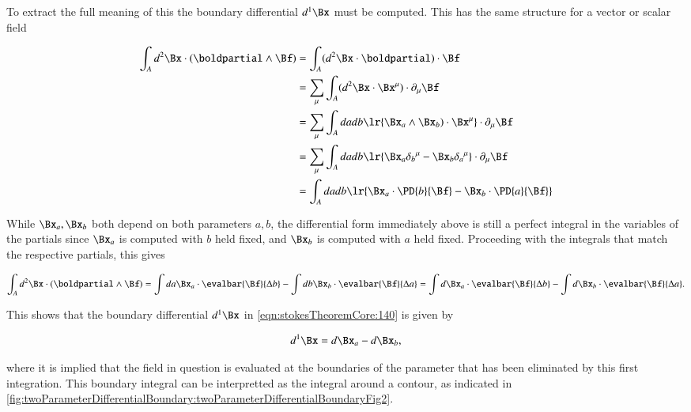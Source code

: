To extract the full meaning of this the boundary differential \( d^1 \Bx \) must be computed.  This has the same structure for a vector or scalar field

\begin{dmath}\label{eqn:stokesTheoremCore:220}
\begin{aligned}
\int_A d^2 \Bx \cdot (\boldpartial \wedge \Bf)
&=
\int_A (d^2 \Bx \cdot \boldpartial) \cdot \Bf \\
&=
\sum_\mu \int_A (d^2 \Bx \cdot \Bx^\mu) \cdot \partial_\mu \Bf \\
&=
\sum_\mu \int_A da db  \lr{ \Bx_a \wedge \Bx_b ) \cdot \Bx^\mu } \cdot \partial_\mu \Bf \\
&=
\sum_\mu \int_A da db  \lr{ \Bx_a {\delta_b}^\mu - \Bx_b {\delta_a}^\mu } \cdot \partial_\mu \Bf \\
&=
\int_A da db  \lr{ \Bx_a \cdot \PD{b}{ \Bf} - \Bx_b \cdot \PD{a}{\Bf} }
\end{aligned}
\end{dmath}

While \( \Bx_a, \Bx_b \) both depend on both parameters \( a, b \), the differential form immediately above is still a perfect integral in the variables of the partials since \( \Bx_a \) is computed with \( b \) held fixed, and \( \Bx_b \) is computed with \( a \) held fixed.  Proceeding with the integrals that match the respective partials, this gives

\begin{dmath}\label{eqn:stokesTheoremCore:240}
\int_A d^2 \Bx \cdot (\boldpartial \wedge \Bf)
=
\int
da \Bx_a \cdot \evalbar{\Bf}{\Delta b}
-\int
db \Bx_b \cdot \evalbar{\Bf}{\Delta a}
=
\int
d\Bx_a \cdot \evalbar{\Bf}{\Delta b}
-\int
d\Bx_b \cdot \evalbar{\Bf}{\Delta a}.
\end{dmath}

This shows that the boundary differential \( d^1 \Bx \) in \cref{eqn:stokesTheoremCore:140} is given by

\begin{dmath}\label{eqn:stokesTheoremCore:260}
d^1 \Bx = d\Bx_a - d\Bx_b,
\end{dmath}

where it is implied that the field in question is evaluated at the boundaries of the parameter that has been eliminated by this first integration.  This boundary integral can be interpretted as the integral around a contour, as indicated in
\cref{fig:twoParameterDifferentialBoundary:twoParameterDifferentialBoundaryFig2}.


